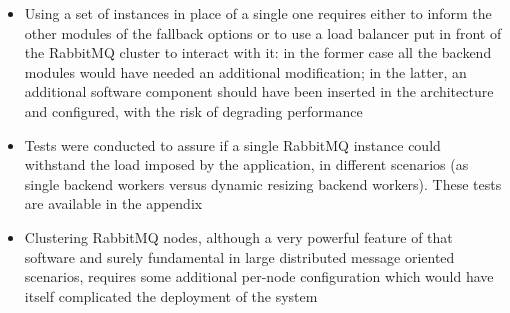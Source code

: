   \begin{itemize}
    \item Using a set of instances in place of a single one requires either to inform the other modules of the fallback options or to use a load balancer put in front of the RabbitMQ cluster to interact with it: in the former case all the backend modules would have needed an additional modification; in the latter, an additional software component should have been inserted in the architecture and configured, with the risk of degrading performance
    \item Tests were conducted to assure if a single RabbitMQ instance could withstand the load imposed by the application, in different scenarios (as single backend workers versus dynamic resizing backend workers). These tests are available in the appendix
    \item Clustering RabbitMQ nodes, although a very powerful feature of that software and surely fundamental in large distributed message oriented scenarios, requires some additional per-node configuration which would have itself complicated the deployment of the system
  \end{itemize}

